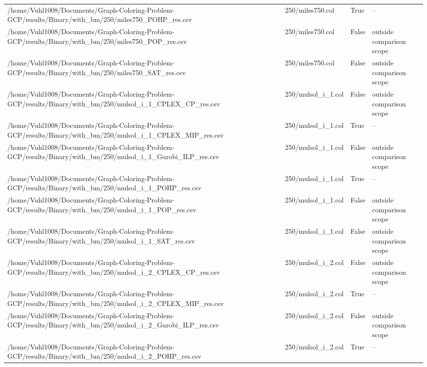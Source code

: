 \begin{table}[htbp]
\begin{tabular}{llll}
/home/Vuhl1008/Documents/Graph-Coloring-Problem-GCP/results/Binary/with\_bm/250/miles750\_POHP\_res.csv & 250/miles750.col & True & -- \\
/home/Vuhl1008/Documents/Graph-Coloring-Problem-GCP/results/Binary/with\_bm/250/miles750\_POP\_res.csv & 250/miles750.col & False & outside comparison scope \\
/home/Vuhl1008/Documents/Graph-Coloring-Problem-GCP/results/Binary/with\_bm/250/miles750\_SAT\_res.csv & 250/miles750.col & False & outside comparison scope \\
/home/Vuhl1008/Documents/Graph-Coloring-Problem-GCP/results/Binary/with\_bm/250/mulsol\_i\_1\_CPLEX\_CP\_res.csv & 250/mulsol\_i\_1.col & False & outside comparison scope \\
/home/Vuhl1008/Documents/Graph-Coloring-Problem-GCP/results/Binary/with\_bm/250/mulsol\_i\_1\_CPLEX\_MIP\_res.csv & 250/mulsol\_i\_1.col & True & -- \\
/home/Vuhl1008/Documents/Graph-Coloring-Problem-GCP/results/Binary/with\_bm/250/mulsol\_i\_1\_Gurobi\_ILP\_res.csv & 250/mulsol\_i\_1.col & False & outside comparison scope \\
/home/Vuhl1008/Documents/Graph-Coloring-Problem-GCP/results/Binary/with\_bm/250/mulsol\_i\_1\_POHP\_res.csv & 250/mulsol\_i\_1.col & True & -- \\
/home/Vuhl1008/Documents/Graph-Coloring-Problem-GCP/results/Binary/with\_bm/250/mulsol\_i\_1\_POP\_res.csv & 250/mulsol\_i\_1.col & False & outside comparison scope \\
/home/Vuhl1008/Documents/Graph-Coloring-Problem-GCP/results/Binary/with\_bm/250/mulsol\_i\_1\_SAT\_res.csv & 250/mulsol\_i\_1.col & False & outside comparison scope \\
/home/Vuhl1008/Documents/Graph-Coloring-Problem-GCP/results/Binary/with\_bm/250/mulsol\_i\_2\_CPLEX\_CP\_res.csv & 250/mulsol\_i\_2.col & False & outside comparison scope \\
/home/Vuhl1008/Documents/Graph-Coloring-Problem-GCP/results/Binary/with\_bm/250/mulsol\_i\_2\_CPLEX\_MIP\_res.csv & 250/mulsol\_i\_2.col & True & -- \\
/home/Vuhl1008/Documents/Graph-Coloring-Problem-GCP/results/Binary/with\_bm/250/mulsol\_i\_2\_Gurobi\_ILP\_res.csv & 250/mulsol\_i\_2.col & False & outside comparison scope \\
/home/Vuhl1008/Documents/Graph-Coloring-Problem-GCP/results/Binary/with\_bm/250/mulsol\_i\_2\_POHP\_res.csv & 250/mulsol\_i\_2.col & True & -- \\

\end{tabular}
\end{table}
